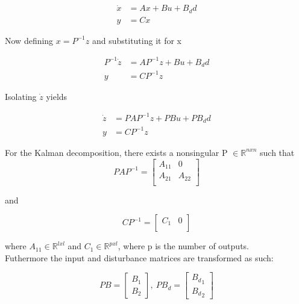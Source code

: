\begin{equation}
	\begin{split}
		\dot{x} & = Ax + Bu + B_dd \\
		y & = Cx
	\end{split}
\end{equation}

Now defining $x = P^{-1}z$ and substituting it for x

\begin{equation}
	\begin{split}
		P^{-1}\dot{z} & = AP^{-1}z + Bu + B_dd \\
		y & = CP^{-1}z
	\end{split}
\end{equation}

Isolating $\dot{z}$ yields

\begin{equation}
	\begin{split}
		\dot{z} & = PAP^{-1}z + PBu + PB_dd \\
		y & = CP^{-1}z
	\end{split}
\end{equation}

For the Kalman decomposition, there exists a nonsingular P  $\in \mathbb{R} ^{n x n}$ such that
\begin{equation}
	PAP^{-1} = \begin{bmatrix}
		A_{11}       & 0 \\
		A_{21}       & A_{22} \\
	\end{bmatrix}
\end{equation}

and

\begin{equation}
	CP^{-1} = \begin{bmatrix}
		C_{1}       & 0 \\
	\end{bmatrix}
\end{equation}

where $A_{11} \in \mathbb{R} ^{l x l}$ and $C_{1} \in \mathbb{R} ^{p x l}$, where p is the number of outputs.\\Futhermore the input and disturbance matrices are transformed as such:

\begin{equation}
	PB = \begin{bmatrix}
		B_1 \\
		B_2
	\end{bmatrix}, \
	PB_d = \begin{bmatrix}
		{B_d}_1 \\
		{B_d}_2
	\end{bmatrix}
\end{equation}



